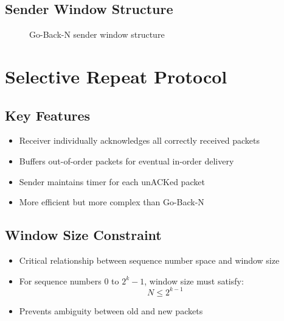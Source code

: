 \documentclass[12pt]{article}
\begin{document}
\subsection{Sender Window Structure}
\begin{figure}[h]
    \centering
    \caption{Go-Back-N sender window structure}
    \label{fig:gbn_window}
\end{figure}

\section{Selective Repeat Protocol}

\subsection{Key Features}
\begin{itemize}
    \item Receiver individually acknowledges all correctly received packets
    \item Buffers out-of-order packets for eventual in-order delivery
    \item Sender maintains timer for each unACKed packet
    \item More efficient but more complex than Go-Back-N
\end{itemize}

\subsection{Window Size Constraint}
\begin{itemize}
    \item Critical relationship between sequence number space and window size
    \item For sequence numbers 0 to $2^k - 1$, window size must satisfy:
          \[
              N \leq 2^{k-1}
          \]
    \item Prevents ambiguity between old and new packets
\end{itemize}
\end{document}
